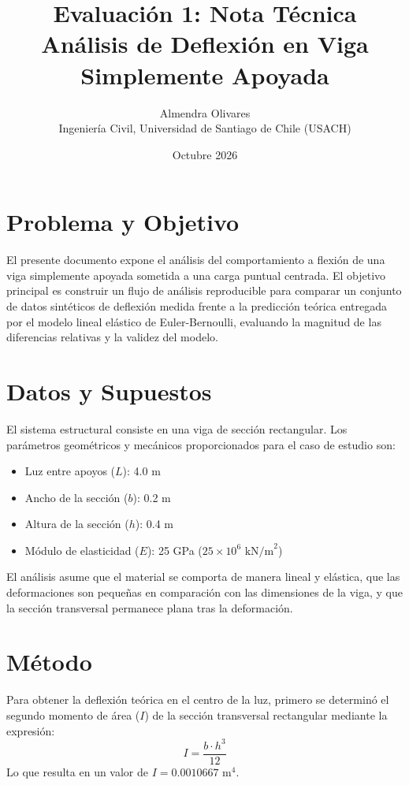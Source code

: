 \documentclass[11pt,a4paper]{article}
\title{\vspace{-2cm}\textbf{Evaluación 1: Nota Técnica \\ Análisis de Deflexión en Viga Simplemente Apoyada}}
\author{Almendra Olivares \\ Ingeniería Civil, Universidad de Santiago de Chile (USACH)}
\date{Octubre 2026}
\begin{document}
\maketitle

\section{Problema y Objetivo}
El presente documento expone el análisis del comportamiento a flexión de una viga simplemente apoyada sometida a una carga puntual centrada. El objetivo principal es construir un flujo de análisis reproducible para comparar un conjunto de datos sintéticos de deflexión medida frente a la predicción teórica entregada por el modelo lineal elástico de Euler-Bernoulli, evaluando la magnitud de las diferencias relativas y la validez del modelo.

\section{Datos y Supuestos}
El sistema estructural consiste en una viga de sección rectangular. Los parámetros geométricos y mecánicos proporcionados para el caso de estudio son:
\begin{itemize}
    \item Luz entre apoyos ($L$): 4.0 m
    \item Ancho de la sección ($b$): 0.2 m
    \item Altura de la sección ($h$): 0.4 m
    \item Módulo de elasticidad ($E$): 25 GPa ($25 \times 10^6 \text{ kN/m}^2$)
\end{itemize}

El análisis asume que el material se comporta de manera lineal y elástica, que las deformaciones son pequeñas en comparación con las dimensiones de la viga, y que la sección transversal permanece plana tras la deformación.

\section{Método}
Para obtener la deflexión teórica en el centro de la luz, primero se determinó el segundo momento de área ($I$) de la sección transversal rectangular mediante la expresión:
\begin{equation}
    I = \frac{b \cdot h^3}{12}
\end{equation}
Lo que resulta en un valor de $I = 0.0010667 \text{ m}^4$. 
\end{document}
